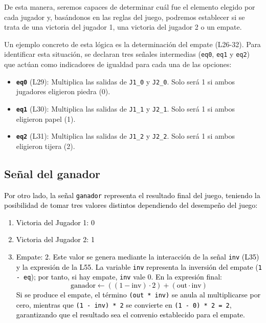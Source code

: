 \documentclass[a4paper,12pt]{report}
\begin{document}
	
	\vspace{0.2cm}
	\noindent De esta manera, seremos capaces de determinar cuál fue el elemento elegido por cada jugador y, basándonos en las reglas del juego, podremos establecer si se trata de una victoria del jugador 1, una victoria del jugador 2 o un empate.
	
	\vspace{0.3cm}
	\noindent Un ejemplo concreto de esta lógica es la determinación del empate (L26-32). Para identificar esta situación, se declaran tres señales intermedias (\texttt{eq0}, \texttt{eq1} y \texttt{eq2}) que actúan como indicadores de igualdad para cada una de las opciones:
	
	\begin{itemize}
		\item \textbf{\texttt{eq0}} (L29): Multiplica las salidas de \texttt{J1\_0} y \texttt{J2\_0}. Solo será 1 si ambos jugadores eligieron piedra (0).
		\item \textbf{\texttt{eq1}} (L30): Multiplica las salidas de \texttt{J1\_1} y \texttt{J2\_1}. Solo será 1 si ambos eligieron papel (1).
		\item \textbf{\texttt{eq2}} (L31): Multiplica las salidas de \texttt{J1\_2} y \texttt{J2\_2}. Solo será 1 si ambos eligieron tijera (2).
	\end{itemize}
	
	\subsection{Señal del ganador}
	\vspace{0.2cm}
	\noindent \textcolor{black}{Por otro lado, la señal \texttt{ganador} representa el resultado final del juego, teniendo la posibilidad de tomar tres valores distintos dependiendo del desempeño del juego:}
	
	\textcolor{black}{
		\begin{enumerate}
			\item Victoria del Jugador 1: 0
			\item Victoria del Jugador 2: 1
			\item Empate: 2. Este valor se genera mediante la interacción de la señal \texttt{inv} (L35) y la expresión de la L55. La variable \texttt{inv} representa la inversión del empate (\texttt{1 - eq}); por tanto, si hay empate, \texttt{inv} vale 0. En la expresión final:
			\begin{equation*}
				\text{ganador} \longleftarrow ((1 - \text{inv}) \cdot 2) + (\text{out} \cdot \text{inv})
			\end{equation*}
			\noindent Si se produce el empate, el término \texttt{(out * inv)} se anula al multiplicarse por cero, mientras que \texttt{(1 - inv) * 2} se convierte en \texttt{(1 - 0) * 2 = 2}, garantizando que el resultado sea el convenio establecido para el empate.
	\end{enumerate}}
	
\end{document}
